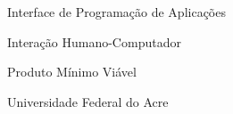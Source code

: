 \listoffigures*
\cleardoublepage

\listofquadros
\cleardoublepage

\listoftables*
\cleardoublepage

\begin{siglas}
  \item[API] Interface de Programação de Aplicações
  \item[IHC] Interação Humano-Computador
  \item[MVP] Produto Mínimo Viável
  \item[UFAC] Universidade Federal do Acre
\end{siglas}
\cleardoublepage

